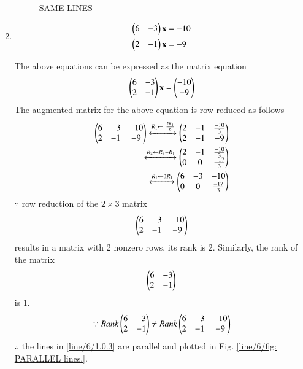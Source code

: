 \begin{enumerate}
\begin{figure}[ht!]
    \caption{SAME LINES}
    \label{line/6/fig:SAME LINES.}
\end{figure} 
%
\item
\begin{align}
\begin{split}
\begin{pmatrix}6 & -3 \end{pmatrix}\mathbf{x}&=-10
\\
\begin{pmatrix}2 & -1 \end{pmatrix}\mathbf{x}&=-9
\end{split}
\end{align}

The above equations can be expressed as the matrix equation
\begin{align}
\begin{pmatrix}6 & -3\\2 & -1\end{pmatrix} \mathbf{x} = \begin{pmatrix}-10\\-9\end{pmatrix}
\end{align}
%
The augmented matrix for the above equation is row reduced as follows
\begin{align}
\begin{pmatrix}6 & -3 & -10\\2 & -1 & -9 \end{pmatrix} 
\xleftrightarrow {R_1\leftarrow \ \frac{2R_1}{6}}\begin{pmatrix}2 & -1 & \frac{-10}{3}\\2 & -1 & -9\end{pmatrix} 
\\
\xleftrightarrow {R_2\leftarrow R_2-R_1}\begin{pmatrix}2 & -1 & \frac{-10}{3} \\0 & 0 & \frac{-17}{3} \end{pmatrix}
\\
\xleftrightarrow {R_1\leftarrow 3R_1}\begin{pmatrix}6 & -3 & -10 \\0 & 0 & \frac{-17}{3}\end{pmatrix} 
\end{align}
%
$\because$ row reduction of the $2\times 3$ matrix
%
\begin{align}
\begin{pmatrix}6 & -3 & -10\\2 & -1 & -9\end{pmatrix}
\end{align}
%
results in a matrix with 2 nonzero rows, its rank is 2. 
%
Similarly, the rank of the matrix 
\begin{align}
\begin{pmatrix}6 & -3 \\2 & -1 \end{pmatrix} 
\end{align}
%
is 1.
%
\begin{align}
\because Rank \begin{pmatrix}6 & -3 \\2 & -1 \end{pmatrix} \ne Rank \begin{pmatrix}6 & -3 & -10\\2 & -1 & -9\end{pmatrix}
\end{align}
$\therefore$ the lines in  \eqref{line/6/1.0.3} are parallel and plotted in Fig.     \ref{line/6/fig: PARALLEL lines.}.

\end{enumerate}
